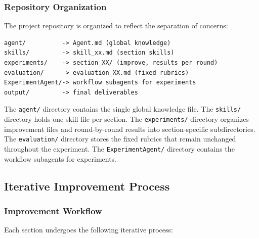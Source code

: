 \subsubsection{Repository Organization}

The project repository is organized to reflect the separation of concerns:

\begin{lstlisting}[basicstyle=\ttfamily\small, frame=single]
agent/          -> Agent.md (global knowledge)
skills/         -> skill_xx.md (section skills)
experiments/    -> section_XX/ (improve, results per round)
evaluation/     -> evaluation_XX.md (fixed rubrics)
ExperimentAgent/-> workflow subagents for experiments
output/         -> final deliverables
\end{lstlisting}

The \texttt{agent/} directory contains the single global knowledge file. The \texttt{skills/} directory holds one skill file per section. The \texttt{experiments/} directory organizes improvement files and round-by-round results into section-specific subdirectories. The \texttt{evaluation/} directory stores the fixed rubrics that remain unchanged throughout the experiment. The \texttt{ExperimentAgent/} directory contains the workflow subagents for experiments.


\subsection{Iterative Improvement Process}

\subsubsection{Improvement Workflow}

Each section undergoes the following iterative process:

